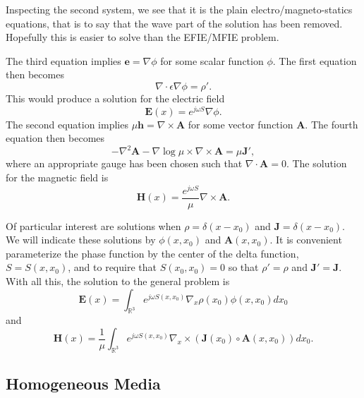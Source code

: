 \documentclass{article}
\theoremstyle{plain}
\begin{document}
Inspecting the second system, we see that it is the plain electro/magneto-statics equations, that is to say that the wave part of the solution has been removed. Hopefully this is easier to solve than the EFIE/MFIE problem.

The third equation implies $\mathbf{e} = \nabla\phi$ for some scalar function $\phi$. The first equation then becomes
\begin{equation}
	\nabla\cdot\epsilon\nabla\phi = \rho'.
\end{equation}
This would produce a solution for the electric field
\begin{equation}
	\mathbf{E}(x) = e^{j\omega S}\nabla\phi.
\end{equation}
The second equation implies $\mu\mathbf{h} = \nabla\times\mathbf{A}$ for some vector function $\mathbf{A}$. The fourth equation then becomes
\begin{equation}
	-\nabla^2\mathbf{A} -\nabla\log{\mu}\times\nabla\times\mathbf{A} = \mu\mathbf{J}',
\end{equation}
where an appropriate gauge has been chosen such that $\nabla\cdot\mathbf{A}=0$. The solution for the magnetic field is
\begin{equation}
	\mathbf{H}(x) = \frac{e^{j\omega S}}{\mu}\nabla\times\mathbf{A}.
\end{equation}


Of particular interest are solutions when $\rho = \delta(x-x_0)$ and $\mathbf{J} = \delta(x-x_0)$. We will indicate these solutions by $\phi(x,x_0)$ and $\mathbf{A}(x,x_0)$. It is convenient parameterize the phase function by the center of the delta function, $S=S(x,x_0)$, and to require that $S(x_0,x_0)=0$ so that $\rho'=\rho$ and $\mathbf{J}'=\mathbf{J}$. With all this, the solution to the general problem is
\begin{equation}
	\mathbf{E}(x) = \int_{\mathbb{R}^3} e^{j\omega S(x,x_0)}\nabla_x\rho(x_0)\phi(x,x_0) dx_0
\end{equation}
and
\begin{equation}
	\mathbf{H}(x) = \frac{1}{\mu}\int_{\mathbb{R}^3} e^{j\omega S(x,x_0)}\nabla_x\times\left( \mathbf{J}(x_0)\circ\mathbf{A}(x,x_0) \right) dx_0.
\end{equation}


\subsection{Homogeneous Media}
\end{document}
